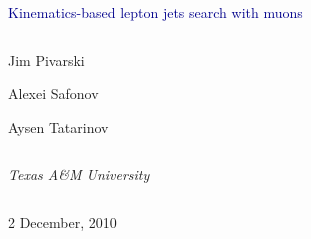 \documentclass[compress]{beamer}
\begin{document}
\begin{frame}
\vfill
\begin{center}
\textcolor{darkblue}{\Large Kinematics-based lepton jets search with muons}

\vfill
\begin{columns}
\begin{center}
\large
Jim Pivarski

Alexei Safonov

Aysen Tatarinov
\end{center}
\end{columns}

\begin{columns}
\begin{center}
\scriptsize
{\it Texas A\&M University}
\end{center}
\end{columns}

\vfill
 2 December, 2010

\end{center}
\end{frame}


\small
\end{document}
